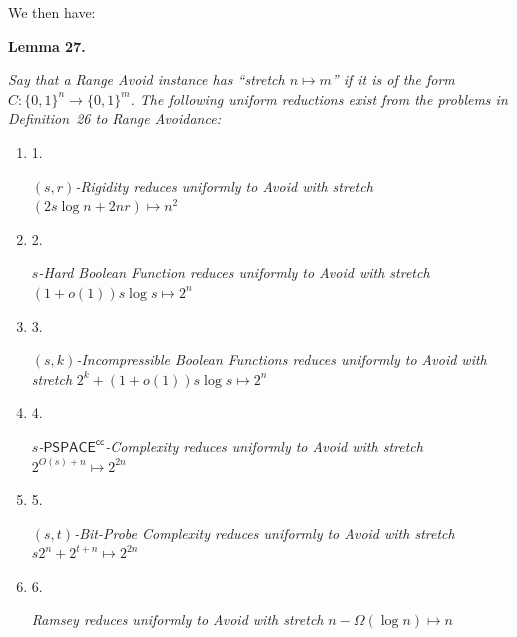 \documentclass[10pt,a4paper]{article}
\begin{document}



We then have:\par





\par\medskip\noindent\textbf{
\textbf{Lemma 27}\textbf{.}
}\par



\emph{Say that a Range Avoid instance has “stretch $n\mapsto m$” if it is of the form $C:\{0,1\}^{n}\to\{0,1\}^{m}$. The following uniform reductions exist from the problems in Definition 26 to Range Avoidance:}\par


\begin{enumerate}


\item[] 
1. 


$(s,r)$\emph{-Rigidity reduces uniformly to Avoid with stretch }$(2s\log n+2nr)\mapsto n^{2}$\emph{}\par





\item[] 
2. 


$s$\emph{-Hard Boolean Function reduces uniformly to Avoid with stretch }$(1+o(1))s\log s\mapsto 2^{n}$\emph{}\par





\item[] 
3. 


$(s,k)$\emph{-Incompressible Boolean Functions reduces uniformly to Avoid with stretch }$2^{k}+(1+o(1))s\log s\mapsto 2^{n}$\emph{}\par





\item[] 
4. 


$s$\emph{-}${\mathsf{PSPACE}}^{{\mathsf{cc}}}$\emph{-Complexity reduces uniformly to Avoid with stretch }$2^{O(s)+n}\mapsto 2^{2n}$\emph{}\par





\item[] 
5. 


$(s,t)$\emph{-Bit-Probe Complexity reduces uniformly to Avoid with stretch }$s2^{n}+2^{t+n}\mapsto 2^{2n}$\emph{}\par





\item[] 
6. 


\emph{Ramsey reduces uniformly to Avoid with stretch }$n-\Omega(\log n)\mapsto n$\emph{}\par





\end{enumerate}
\end{document}

